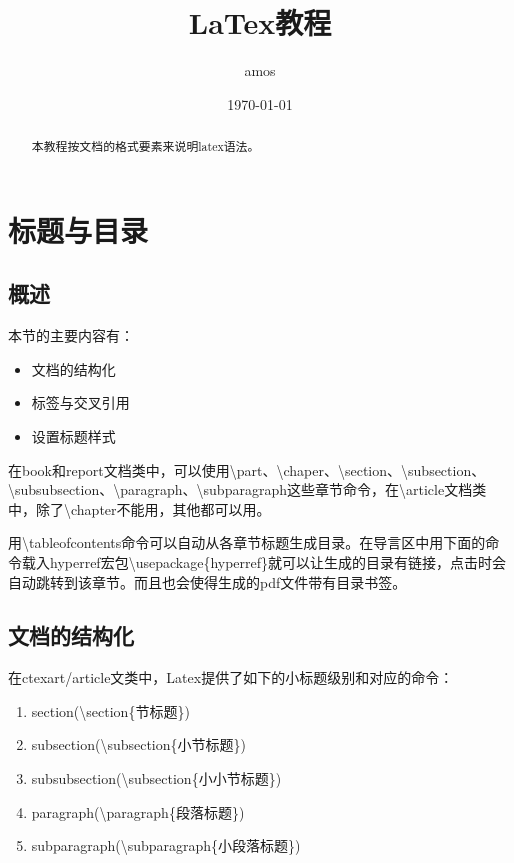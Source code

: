 \documentclass[UTF8,a4paper]{ctexart}
\begin{document}
\title{LaTex教程}
\author{amos}
\date{\today}
\maketitle

\begin{abstract}
    本教程按文档的格式要素来说明latex语法。
\end{abstract}
    
\section{标题与目录}
    \subsection{概述}
        本节的主要内容有：
            \begin{itemize}
                \item 文档的结构化
                \item 标签与交叉引用
                \item 设置标题样式
            \end{itemize}
        在book和report文档类中，可以使用\textbackslash part、\textbackslash chaper、\textbackslash section、\textbackslash subsection、\textbackslash subsubsection、\textbackslash paragraph、\textbackslash subparagraph这些章节命令，在\textbackslash article文档类中，除了\textbackslash chapter不能用，其他都可以用。

        用\textbackslash tableofcontents命令可以自动从各章节标题生成目录。在导言区中用下面的命令载入hyperref宏包\textbackslash usepackage\{hyperref\}就可以让生成的目录有链接，点击时会自动跳转到该章节。而且也会使得生成的pdf文件带有目录书签。

    \subsection{文档的结构化}
        在ctexart/article文类中，Latex提供了如下的小标题级别和对应的命令：

            \begin{enumerate}
                \item section(\textbackslash section\{节标题\})
                \item subsection(\textbackslash subsection\{小节标题\})
                \item subsubsection(\textbackslash subsection\{小小节标题\})
                \item paragraph(\textbackslash paragraph\{段落标题\})
                \item subparagraph(\textbackslash subparagraph\{小段落标题\})
            \end{enumerate}
    
\end{document}
